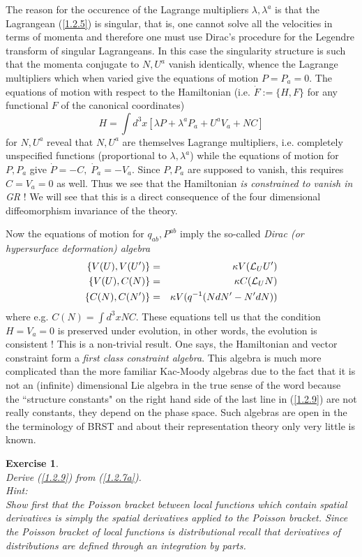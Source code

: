 \documentclass[12pt]{report}
\newtheorem{Exercise}{Exercise}[section]
\def\be{\begin{equation}}
\def\ee{\end{equation}}
\def\ba{\begin{eqnarray}}
\def\ea{\end{eqnarray}}
\begin{document}
The reason for the occurence of the Lagrange multipliers $\lambda,\lambda^a$
is that the Lagrangean (\ref{1.2.5}) is singular, that is, one cannot 
solve all the velocities in terms of momenta and therefore one must
use Dirac's procedure \cite{17} for the Legendre transform of singular 
Lagrangeans.
In this case the singularity structure is such that the momenta conjugate 
to $N,U^a$ vanish identically, whence the Lagrange multipliers which when
varied give the equations of motion $P=P_a=0$. The equations of motion 
with respect to the Hamiltonian (i.e. $\dot{F}:=\{H,F\}$ for any 
functional $F$ of the canonical coordinates)
\be \label{1.2.8}
H=\int d^3x [\lambda P+\lambda^a P_a+U^a V_a+N C] 
\ee
for
$N,U^a$ reveal that $N,U^a$ are themselves Lagrange multipliers, i.e.
completely unspecified functions (proportional to $\lambda,\lambda^a$) while 
the equations of motion for 
$P,P_a$ give $\dot{P}=-C,\;\dot{P}_a=-V_a$. Since $P,P_a$ are supposed to 
vanish, this requires $C=V_a=0$ as well. Thus we see that the 
Hamiltonian 
{\it is constrained to vanish in GR} ! We will see that this is a direct 
consequence of the four dimensional diffeomorphism invariance of the 
theory.

Now the equations of motion for $q_{ab},P^{ab}$ imply the 
so-called {\it Dirac (or hypersurface deformation) algebra}
\ba \label{1.2.9}
\{V(U),V(U')\}&=&\kappa V({\cal L}_U U') \nonumber\\
\{V(U),C(N)\}&=&\kappa C({\cal L}_U N) \nonumber\\
\{C(N),C(N')\}&=&\kappa V(q^{-1}(N dN'-N' dN))
\ea
where e.g. $C(N)=\int d^3x N C$. These equations tell us that
the condition $H=V_a=0$ is preserved under evolution, in other words,
the evolution is consistent ! This is a non-trivial result. One says,
the Hamiltonian and vector constraint form a {\it first class constraint 
algebra}.
This algebra is much more complicated than the more familiar Kac-Moody
algebras due to the fact that it is not an (infinite) dimensional Lie algebra
in the true sense of the word because the ``structure constants" on the 
right hand side of the last line in (\ref{1.2.9}) are not really constants,
they depend on the phase space. Such algebras are open in the the 
terminology of BRST \cite{18} and about their representation theory
only very little is known.
%
\begin{Exercise} \label{ex1.2.1.0} ~~~\\
Derive (\ref{1.2.9}) from (\ref{1.2.7a}).\\
Hint:\\
Show first that the Poisson bracket between local functions which contain
spatial derivatives is simply the spatial derivatives applied to the
Poisson bracket. Since the Poisson bracket of local functions is
distributional recall that derivatives of distributions are defined 
through an integration by parts.    
\end{Exercise}
%
\end{document}
